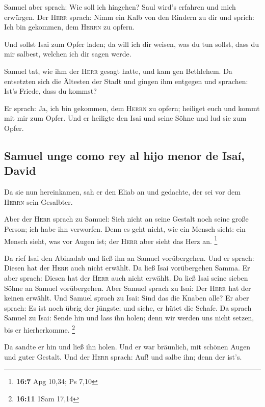  Samuel aber sprach: Wie soll ich hingehen? Saul wird's
erfahren und mich erwürgen. Der \textsc{Herr} sprach: Nimm ein Kalb von
den Rindern zu dir und sprich: Ich bin gekommen, dem \textsc{Herrn} zu
opfern.

 Und sollst Isai zum Opfer laden; da will ich dir weisen,
was du tun sollst, dass du mir salbest, welchen ich dir sagen werde.

 Samuel tat, wie ihm der \textsc{Herr} gesagt hatte, und
kam gen Bethlehem. Da entsetzten sich die Ältesten der Stadt und gingen
ihm entgegen und sprachen: Ist's Friede, dass du kommst?

 Er sprach: Ja, ich bin gekommen, dem \textsc{Herrn} zu
opfern; heiliget euch und kommt mit mir zum Opfer. Und er heiligte den
Isai und seine Söhne und lud sie zum Opfer.

\hypertarget{samuel-unge-como-rey-al-hijo-menor-de-isauxed-david}{%
\subsection{Samuel unge como rey al hijo menor de Isaí,
David}\label{samuel-unge-como-rey-al-hijo-menor-de-isauxed-david}}

 Da sie nun hereinkamen, sah er den Eliab an und gedachte,
der sei vor dem \textsc{Herrn} sein Gesalbter.

 Aber der \textsc{Herr} sprach zu Samuel: Sieh nicht an
seine Gestalt noch seine große Person; ich habe ihn verworfen. Denn es
geht nicht, wie ein Mensch sieht: ein Mensch sieht, was vor Augen ist;
der \textsc{Herr} aber sieht das Herz an. \footnote{\textbf{16:7} Apg
  10,34; Ps 7,10}

 Da rief Isai den Abinadab und ließ ihn an Samuel
vorübergehen. Und er sprach: Diesen hat der \textsc{Herr} auch nicht
erwählt.  Da ließ Isai vorübergehen Samma. Er aber sprach:
Diesen hat der \textsc{Herr} auch nicht erwählt.  Da ließ
Isai seine sieben Söhne an Samuel vorübergehen. Aber Samuel sprach zu
Isai: Der \textsc{Herr} hat der keinen erwählt.  Und
Samuel sprach zu Isai: Sind das die Knaben alle? Er aber sprach: Es ist
noch übrig der jüngste; und siehe, er hütet die Schafe. Da sprach Samuel
zu Isai: Sende hin und lass ihn holen; denn wir werden uns nicht setzen,
bis er hierherkomme. \footnote{\textbf{16:11} 1Sam 17,14}

 Da sandte er hin und ließ ihn holen. Und er war
bräunlich, mit schönen Augen und guter Gestalt. Und der \textsc{Herr}
sprach: Auf! und salbe ihn; denn der ist's.

